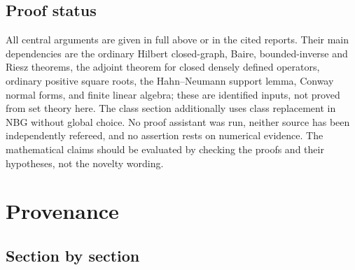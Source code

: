 \documentclass[11pt,letterpaper]{article}
\numberwithin{equation}{section}
\theoremstyle{definition}
\theoremstyle{remark}
\begin{document}
\subsection{Proof status}
All central arguments are given in full above or in the cited reports. Their
main dependencies are the ordinary Hilbert closed-graph, Baire,
bounded-inverse and Riesz theorems, the adjoint theorem for closed densely
defined operators, ordinary positive square roots, the Hahn--Neumann support
lemma, Conway normal forms, and finite linear algebra; these are identified
inputs, not proved from set theory here. The class section additionally uses
class replacement in NBG without global choice. No proof assistant was run,
neither source has been independently refereed, and no assertion rests on
numerical evidence. The mathematical claims should be evaluated by checking
the proofs and their hypotheses, not the novelty wording.

\clearpage
\appendix
\section{Provenance}\label{hgeo:app:provenance}

\subsection{Section by section}
\end{document}
